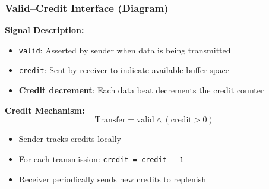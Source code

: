 \documentclass{beamer}
\begin{document}
\begin{frame}
\frametitle{Valid--Credit Interface (Diagram)}

\begin{center}
\end{center}

\vspace{0.5cm}
\textbf{Signal Description:}
\begin{itemize}
    \item \texttt{valid}: Asserted by sender when data is being transmitted
    \item \texttt{credit}: Sent by receiver to indicate available buffer space
    \item \textbf{Credit decrement}: Each data beat decrements the credit counter
\end{itemize}

\vspace{0.3cm}
\textbf{Credit Mechanism:}
\[
\text{Transfer} = \text{valid} \land (\text{credit} > 0)
\]

\begin{itemize}
    \item Sender tracks credits locally
    \item For each transmission: \texttt{credit = credit - 1}
    \item Receiver periodically sends new credits to replenish
\end{itemize}

\end{frame}
\end{document}
